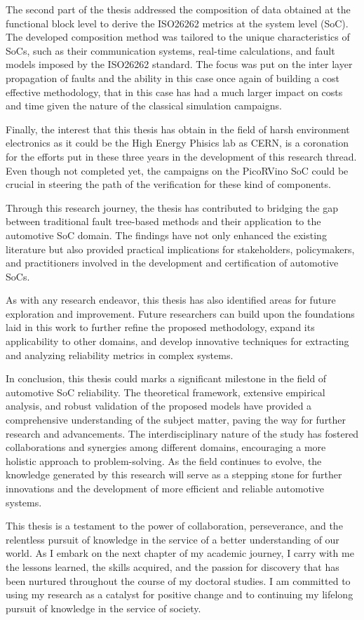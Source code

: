 \documentclass[./dissertation.tex]{subfiles}
\begin{document}
The second part of the thesis addressed the composition of data obtained at the functional block level to derive the ISO26262 metrics at the system level (SoC). The developed composition method was tailored to the unique characteristics of SoCs, such as their communication systems, real-time calculations, and fault models imposed by the ISO26262 standard. The focus was put on the inter layer propagation of faults and the ability in this case once again of building a cost effective methodology, that in this case has had a much larger impact on costs and time given the nature of the classical simulation campaigns.

Finally, the interest that this thesis has obtain in the field of harsh environment electronics as it could be the High Energy Phisics lab as CERN, is a coronation for the efforts put in these three years in the development of this research thread. Even though not completed yet, the campaigns on the PicoRVino SoC could be crucial in steering the path of the verification for these kind of components.

Through this research journey, the thesis has contributed to bridging the gap between traditional fault tree-based methods and their application to the automotive SoC domain. The findings have not only enhanced the existing literature but also provided practical implications for stakeholders, policymakers, and practitioners involved in the development and certification of automotive SoCs.

As with any research endeavor, this thesis has also identified areas for future exploration and improvement. Future researchers can build upon the foundations laid in this work to further refine the proposed methodology, expand its applicability to other domains, and develop innovative techniques for extracting and analyzing reliability metrics in complex systems.

In conclusion, this thesis could marks a significant milestone in the field of automotive SoC reliability. The theoretical framework, extensive empirical analysis, and robust validation of the proposed models have provided a comprehensive understanding of the subject matter, paving the way for further research and advancements. The interdisciplinary nature of the study has fostered collaborations and synergies among different domains, encouraging a more holistic approach to problem-solving. As the field continues to evolve, the knowledge generated by this research will serve as a stepping stone for further innovations and the development of more efficient and reliable automotive systems.

This thesis is a testament to the power of collaboration, perseverance, and the relentless pursuit of knowledge in the service of a better understanding of our world. As I embark on the next chapter of my academic journey, I carry with me the lessons learned, the skills acquired, and the passion for discovery that has been nurtured throughout the course of my doctoral studies. I am committed to using my research as a catalyst for positive change and to continuing my lifelong pursuit of knowledge in the service of society.
\end{document}
